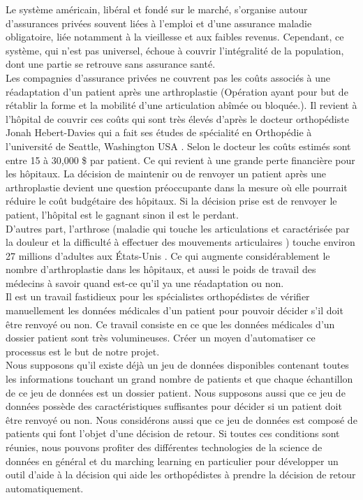\documentclass[12pt, french]{report}
\begin{document}
Le système américain, libéral et fondé sur le marché, s’organise autour d’assurances privées souvent liées à l’emploi et d’une assurance maladie obligatoire, liée notamment à la vieillesse et aux faibles revenus.
Cependant, ce système, qui n’est pas universel, échoue à couvrir l’intégralité de la population, dont une partie se retrouve sans assurance santé. \cite{key9} \\

Les compagnies d'assurance privées ne couvrent pas les coûts associés à une réadaptation d'un patient après une arthroplastie (Opération ayant pour but de rétablir la forme et la mobilité d'une articulation abîmée ou bloquée.). Il revient à l'hôpital de couvrir ces coûts qui sont très élevés d'après le docteur orthopédiste Jonah Hebert-Davies qui a fait ses études de spécialité en Orthopédie à l'université de Seattle, Washington USA \cite{key10}. Selon le docteur les coûts estimés sont entre 15 à 30,000 \$ par patient. Ce qui revient à une grande perte financière pour les hôpitaux.  La décision de maintenir ou de renvoyer un patient après une arthroplastie devient une question préoccupante dans la mesure où elle pourrait réduire le coût budgétaire des hôpitaux. Si la décision prise est de renvoyer le patient, l'hôpital est le gagnant sinon il est le perdant. \\ 

D'autres part, l'arthrose (maladie qui touche les articulations et caractérisée par la douleur et la difficulté à effectuer des mouvements articulaires \cite{key12}) touche environ 27 millions d'adultes aux États-Unis \cite{key11}.  Ce qui augmente considérablement le nombre d'arthroplastie dans les hôpitaux, et aussi le poids de travail des médecins à savoir quand est-ce qu'il ya une réadaptation ou non.\\

Il est un travail fastidieux pour les spécialistes orthopédistes de vérifier manuellement les données médicales d'un patient pour pouvoir décider s'il doit être renvoyé ou non. Ce travail consiste en ce que les données médicales d'un dossier patient sont très volumineuses. Créer un moyen d'automatiser ce processus est le but de notre projet.  \\

Nous supposons qu'il existe déjà un jeu de données disponibles contenant toutes les informations touchant un grand nombre de patients et que chaque échantillon de ce jeu de données est un dossier patient. Nous supposons aussi que ce jeu de données possède des caractéristiques suffisantes pour décider si un patient doit être renvoyé ou non. Nous considérons aussi que ce jeu de données est composé de patients qui font l'objet d'une décision de retour. Si toutes ces conditions sont réunies, nous pouvons profiter des différentes technologies de la science de données en général et du marching learning en particulier pour développer un outil d'aide à la décision qui aide les orthopédistes à prendre la décision de retour automatiquement. \\
\end{document}
